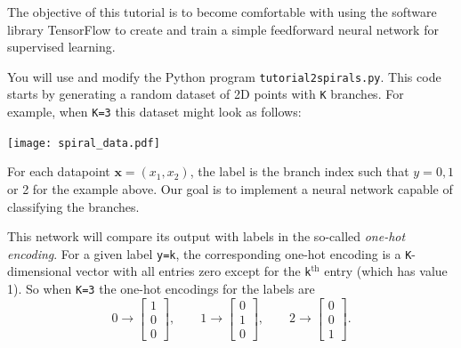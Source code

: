 \documentclass[letterpaper]{scrartcl}
\begin{document}

\vspace{-3cm}


\date{May 28, 2019}

\maketitle

The objective of this tutorial is to become comfortable with using the software library TensorFlow to 
create and train a simple feedforward neural network for supervised learning.

You will use and modify the Python program \texttt{tutorial2{\textunderscore}spirals.py}.
This code starts by generating a random dataset of 2D points with \texttt{K} branches.
For example, when \texttt{K=3} this dataset might look as follows:
\vspace{-3mm}
\begin{center}
\texttt{[image: spiral\_data.pdf]}
\end{center}
For each datapoint $\mathbf{x} = (x_1, x_2)$, the label is the branch index such that $y = 0, 1$ or 2 for the example above.
Our goal is to implement a neural network capable of classifying the branches.

This network will compare its output with labels in the so-called \emph{one-hot encoding}.
For a given label \texttt{y=k}, the corresponding one-hot encoding is a \texttt{K}-dimensional vector with all entries zero 
except for the \texttt{k}$^\text{th}$ entry (which has value 1).
So when \texttt{K=3} the one-hot encodings for the labels are
\begin{equation*}
0 \rightarrow \begin{bmatrix} 1 \\ 0 \\ 0 \end{bmatrix}, \qquad
1 \rightarrow \begin{bmatrix} 0 \\ 1 \\ 0 \end{bmatrix}, \qquad
2 \rightarrow \begin{bmatrix} 0 \\ 0 \\ 1 \end{bmatrix}.
\end{equation*}
\end{document}
